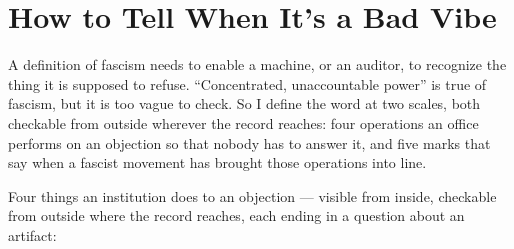 \chapter{How to Tell When It's a Bad Vibe}
\label{sec:3}
A definition of fascism needs to enable a machine, or an auditor, to recognize the thing it is supposed to refuse. “Concentrated, unaccountable power” is true of fascism, but it is too vague to check. So I define the word at two scales, both checkable from outside wherever the record reaches: four operations an office performs on an objection so that nobody has to answer it, and five marks that say when a fascist movement has brought those operations into line.

Four things an institution does to an objection — visible from inside, checkable from outside where the record reaches, each ending in a question about an artifact:

